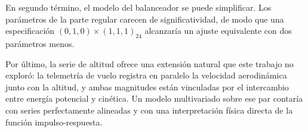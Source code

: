 En segundo término, el modelo del balanceador se puede simplificar. Los
parámetros de la parte regular carecen de significatividad, de modo que una especificación
$(0,1,0)\times(1,1,1)_{24}$ alcanzaría un ajuste equivalente con dos parámetros menos.

Por último, la serie de altitud ofrece una extensión natural que este trabajo no exploró: la telemetría de vuelo registra en paralelo la velocidad aerodinámica junto con la
altitud, y ambas magnitudes están vinculadas por el intercambio entre energía potencial y
cinética. Un modelo multivariado sobre ese par contaría con series perfectamente alineadas y
con una interpretación física directa de la función impulso-respuesta.
